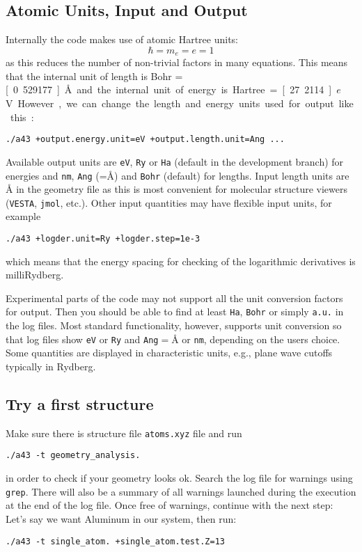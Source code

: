 \documentclass[oribibl]{llncs}
\newcommand{\ttt}[1]{\texttt{#1}}
\begin{document}
\subsection{Atomic Units, Input and Output}
Internally the code makes use of atomic Hartree units:
\begin{equation}
	\hbar = m_e = e = 1
\end{equation}
as this reduces the number of non-trivial factors in many equations.
This means that the internal unit of length is Bohr = \unit[0.529177]{\AA{}}
and the internal unit of energy is Hartree = \unit[27.2114]{$e$V}.
However, we can change the length and energy units used for output like this:
\begin{verbatim}
./a43 +output.energy.unit=eV +output.length.unit=Ang ...
\end{verbatim}
Available output units are \ttt{eV}, \ttt{Ry} or \ttt{Ha} (default in the development branch) for energies 
and \ttt{nm}, \ttt{Ang} (=\AA) and \ttt{Bohr} (default) for lengths.
Input length units are \AA{} in the geometry file as this is most convenient for molecular structure viewers
(\ttt{VESTA}, \ttt{jmol}, etc.). Other input quantities may have flexible input units, for example
\begin{verbatim}
./a43 +logder.unit=Ry +logder.step=1e-3
\end{verbatim}
which means that the energy spacing for checking of the logarithmic derivatives is milliRydberg.


Experimental parts of the code may not support all the unit conversion
factors for output. Then you should be able to find at least \ttt{Ha}, \ttt{Bohr} or simply \ttt{a.u.} in the log files.
Most standard functionality, however, supports unit conversion so that log files
show \ttt{eV} or \ttt{Ry} and \ttt{Ang}$ = $\AA{} or \ttt{nm}, depending on the users choice.
Some quantities are displayed in characteristic units, e.g., plane wave cutoffs typically in Rydberg.


\subsection{Try a first structure}
Make sure there is structure file \ttt{atoms.xyz} file and run
\begin{verbatim}
./a43 -t geometry_analysis.
\end{verbatim}
in order to check if your geometry looks ok.
Search the log file for warnings using \ttt{grep}.
There will also be a summary of all warnings launched during the execution at the end of the log file.
Once free of warnings, continue with the next step:
Let's say we want Aluminum in our system, then run:
\begin{verbatim}
./a43 -t single_atom. +single_atom.test.Z=13
\end{verbatim}
\end{document}

